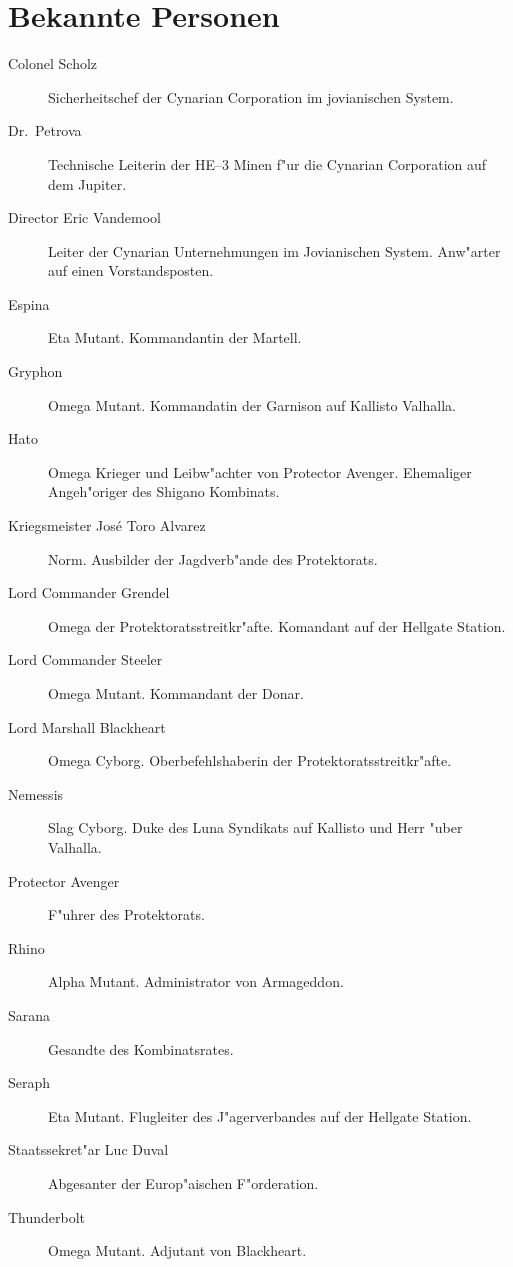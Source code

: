 \section{Bekannte Personen}

\begin{description}
\item [Colonel Scholz] Sicherheitschef der Cynarian Corporation im jovianischen System.
\item [Dr.~Petrova] Technische Leiterin der HE--3 Minen f"ur die Cynarian Corporation auf dem Jupiter.
\item [Director Eric Vandemool] Leiter der Cynarian Unternehmungen im Jovianischen System. Anw"arter auf einen
      Vorstandsposten.
\item [Espina] Eta Mutant. Kommandantin der Martell.
\item [Gryphon] Omega Mutant. Kommandatin der Garnison auf Kallisto Valhalla.
\item [Hato] Omega Krieger und Leibw"achter von Protector Avenger. Ehemaliger Angeh"origer des Shigano Kombinats.
\item [Kriegsmeister Jos\'{e} \frqq{}Toro\flqq{} Alvarez] Norm. Ausbilder der Jagdverb"ande des Protektorats.
\item [Lord Commander Grendel] Omega der Protektoratsstreitkr"afte. Komandant auf der Hellgate Station.
\item [Lord Commander Steeler] Omega Mutant. Kommandant der Donar.
\item [Lord Marshall Blackheart] Omega Cyborg. Oberbefehlshaberin der Protektoratsstreitkr"afte.
\item [Nemessis] Slag Cyborg. Duke des Luna Syndikats auf Kallisto und Herr "uber Valhalla.
\item [Protector Avenger] F"uhrer des Protektorats.
\item [Rhino] Alpha Mutant. Administrator von Armageddon.
\item [Sarana] Gesandte des Kombinatsrates.
\item [Seraph] Eta Mutant. Flugleiter des J"agerverbandes auf der Hellgate Station.
\item [Staatssekret"ar Luc Duval] Abgesanter der Europ"aischen F"orderation.
\item [Thunderbolt] Omega Mutant. Adjutant von Blackheart.
\end{description}